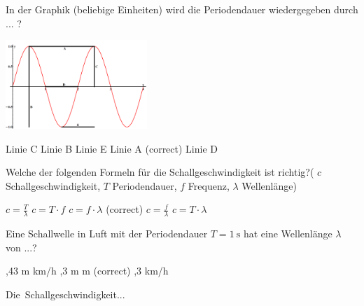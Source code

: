\documentclass[11pt]{exam}
\begin{document}
\setlength{\voffset}{-0.5in}
\setlength{\headsep}{5pt}

\hspace{2mm}
 \hspace{5mm}
\vspace{4mm}

\begin{questions}

\question In der Graphik (beliebige Einheiten) wird die Periodendauer wiedergegeben durch ... ? 

\includegraphics[width=0.4\textwidth]{images/Sinuskurve.png}

\begin{choices}
	\choice Linie C
	\choice Linie B
	\choice Linie E
	\choice Linie A (correct)
	\choice Linie D
\end{choices}

\vspace{3mm}\question Welche der folgenden Formeln für die Schallgeschwindigkeit ist richtig?( \( c \) Schallgeschwindigkeit, \(T \) Periodendauer, \( f \) Frequenz, \( \lambda \) Wellenlänge)

\begin{choices}
	\choice \( c=\frac{T}{\lambda} \)
	\choice \( c=T \cdot f \)
	\choice \( c=f \cdot \lambda \) (correct)
	\choice \( c=\frac{f}{\lambda} \)
	\choice \( c=T \cdot \lambda \)
\end{choices}

\vspace{3mm}\question Eine Schallwelle in Luft mit der Periodendauer \( T= \mathrm{1~s} \) hat eine Wellenlänge \( \lambda \) von ...?

\begin{choices}
	,43 m
	 km/h
	,3 m
	 m (correct)
	,3 km/h
\end{choices}

\vspace{3mm}\question Die Schallgeschwindigkeit...


\end{questions}
\end{document}
